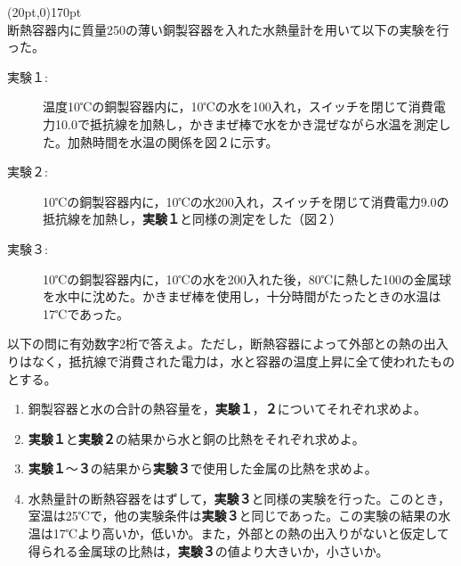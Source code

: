 \hakosyokika
\item
    \begin{mawarikomi}(20pt,0){170pt}{\\}
        断熱容器内に質量250の薄い銅製容器を入れた水熱量計を用いて以下の実験を行った。
        \begin{description}
            \item[実験１:]温度10℃の銅製容器内に，10℃の水を100入れ，スイッチを閉じて消費電力10.0で抵抗線を加熱し，かきまぜ棒で水をかき混ぜながら水温を測定した。加熱時間を水温の関係を図２に示す。
            \item[実験２:]10℃の銅製容器内に，10℃の水200入れ，スイッチを閉じて消費電力9.0の抵抗線を加熱し，{\bf 実験１}と同様の測定をした（図２） 
            \item[実験３:]10℃の銅製容器内に，10℃の水を200入れた後，80℃に熱した100の金属球を水中に沈めた。かきまぜ棒を使用し，十分時間がたったときの水温は17℃であった。 
        \end{description}
        以下の問に有効数字2桁で答えよ。ただし，断熱容器によって外部との熱の出入りはなく，抵抗線で消費された電力は，水と容器の温度上昇に全て使われたものとする。
        \begin{enumerate}
            \item 銅製容器と水の合計の熱容量を，{\bf 実験１}，{\bf ２}についてそれぞれ求めよ。
            \item {\bf 実験１}と{\bf 実験２}の結果から水と銅の比熱をそれぞれ求めよ。
            \item {\bf 実験１}～{\bf ３}の結果から{\bf 実験３}で使用した金属の比熱を求めよ。
            \item 水熱量計の断熱容器をはずして，{\bf 実験３}と同様の実験を行った。このとき，室温は25℃で，他の実験条件は{\bf 実験３}と同じであった。この実験の結果の水温は17℃より高いか，低いか。また，外部との熱の出入りがないと仮定して得られる金属球の比熱は，{\bf 実験３}の値より大きいか，小さいか。
        \end{enumerate}
    \end{mawarikomi}
